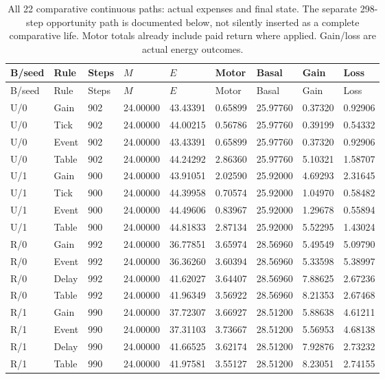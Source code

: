 \begin{longtable}{lllllllll}
\caption{All 22 comparative continuous paths: actual expenses and final state. The separate 298-step opportunity path is documented below, not silently inserted as a complete comparative life. Motor totals already include paid return where applied. Gain/loss are actual energy outcomes.}\label{tab:local-history-costs}\\
\toprule
B/seed & Rule & Steps & $M$ & $E$ & Motor & Basal & Gain & Loss \\
\midrule
\endfirsthead
\toprule
B/seed & Rule & Steps & $M$ & $E$ & Motor & Basal & Gain & Loss \\
\midrule
\endhead
U/0 & Gain & 902 & 24.00000 & 43.43391 & 0.65899 & 25.97760 & 0.37320 & 0.92906 \\
U/0 & Tick & 902 & 24.00000 & 44.00215 & 0.56786 & 25.97760 & 0.39199 & 0.54332 \\
U/0 & Event & 902 & 24.00000 & 43.43391 & 0.65899 & 25.97760 & 0.37320 & 0.92906 \\
U/0 & Table & 902 & 24.00000 & 44.24292 & 2.86360 & 25.97760 & 5.10321 & 1.58707 \\
U/1 & Gain & 900 & 24.00000 & 43.91051 & 2.02590 & 25.92000 & 4.69293 & 2.31645 \\
U/1 & Tick & 900 & 24.00000 & 44.39958 & 0.70574 & 25.92000 & 1.04970 & 0.58482 \\
U/1 & Event & 900 & 24.00000 & 44.49606 & 0.83967 & 25.92000 & 1.29678 & 0.55894 \\
U/1 & Table & 900 & 24.00000 & 44.81833 & 2.87134 & 25.92000 & 5.52295 & 1.43024 \\
R/0 & Gain & 992 & 24.00000 & 36.77851 & 3.65974 & 28.56960 & 5.49549 & 5.09790 \\
R/0 & Event & 992 & 24.00000 & 36.36260 & 3.60394 & 28.56960 & 5.33598 & 5.38997 \\
R/0 & Delay & 992 & 24.00000 & 41.62027 & 3.64407 & 28.56960 & 7.88625 & 2.67236 \\
R/0 & Table & 992 & 24.00000 & 41.96349 & 3.56922 & 28.56960 & 8.21353 & 2.67468 \\
R/1 & Gain & 990 & 24.00000 & 37.72307 & 3.66927 & 28.51200 & 5.88638 & 4.61211 \\
R/1 & Event & 990 & 24.00000 & 37.31103 & 3.73667 & 28.51200 & 5.56953 & 4.68138 \\
R/1 & Delay & 990 & 24.00000 & 41.66525 & 3.62174 & 28.51200 & 7.92876 & 2.73232 \\
R/1 & Table & 990 & 24.00000 & 41.97581 & 3.55127 & 28.51200 & 8.23051 & 2.74155 \\

\end{longtable}
